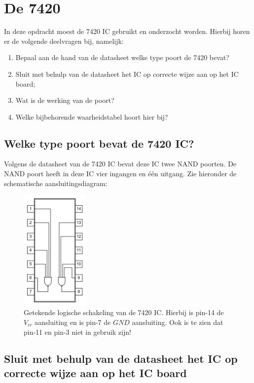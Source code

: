 \documentclass[12pt]{article}
\begin{document}
\section{De 7420}
In deze opdracht moest de 7420 IC gebruikt en onderzocht worden. 
Hierbij horen er de volgende deelvragen bij, namelijk:

\begin{enumerate}
    \item Bepaal aan de hand van de datasheet welke type poort de 7420 bevat?
    \item Sluit met behulp van de datasheet het IC op correcte wijze aan op het IC board; 
    \item Wat is de werking van de poort? 
    \item Welke bijbehorende waarheidstabel hoort hier bij?
\end{enumerate}
\pagebreak
\subsection{Welke type poort bevat de 7420 IC?}
Volgens de datasheet van de 7420 IC bevat deze IC twee NAND poorten. De NAND poort heeft in deze IC vier ingangen en één uitgang. 
Zie hieronder de schematische aansluitingsdiagram:

\begin{figure}[h]
    \centering
    \includegraphics[width=0.3\textwidth]{7420_SCHEMA.png}
    \caption{Getekende logische schakeling van de 7420 IC. Hierbij is pin-14 de $V_{cc}$ aansluiting en is pin-7 de $GND$ aansluiting. Ook is te zien dat pin-11 en pin-3 niet in gebruik zijn!}
    \label{fig:7420SCHEMA}
\end{figure}

\subsection{Sluit met behulp van de datasheet het IC op correcte wijze aan op het IC board}
\end{document}
